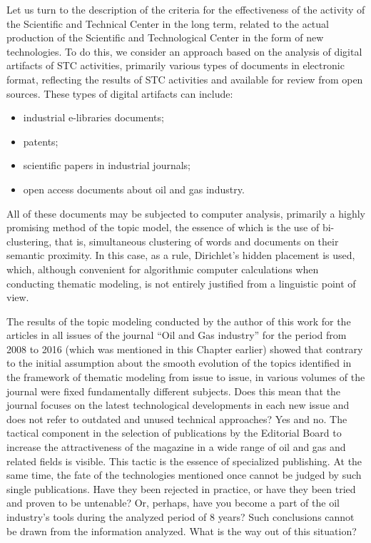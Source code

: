 \documentclass[12pt]{report}
\theoremstyle{definition}
\providecommand{\tightlist}{%
	\setlength{\itemsep}{0pt}\setlength{\parskip}{0pt}}
\begin{document}
Let us turn to the description of the criteria for the effectiveness of the activity of the Scientific and Technical Center in the long term, related to the actual production of the Scientific and Technological Center in the form of new technologies.
To do this, we consider an approach based on the analysis of digital artifacts of STC activities, primarily various types of documents in electronic format, reflecting the results of STC activities and available for review from open sources.
These types of digital artifacts can include:

\begin{itemize} 
	\tightlist 
	\item industrial e-libraries documents; 
	\item patents; 
	\item scientific papers in industrial journals; 
	\item open access documents about oil and gas industry. 
\end{itemize}  

All of these documents may be subjected to computer analysis, primarily a highly promising method of the topic model, the essence of which is the use of bi-clustering, that is, simultaneous clustering of words and documents on their semantic proximity.
In this case, as a rule, Dirichlet's hidden placement is used, which, although convenient for algorithmic computer calculations when conducting thematic modeling, is not entirely justified from a linguistic point of view.

The results of the topic modeling conducted by the author of this work for the articles in all issues of the journal  ``Oil and Gas industry'' for the period from 2008 to 2016 (which was mentioned in this Chapter earlier) showed that contrary to the initial assumption about the smooth evolution of the topics identified in the framework of thematic modeling from issue to issue, in various volumes of the journal were fixed fundamentally different subjects.
Does this mean that the journal focuses on the latest technological developments in each new issue and does not refer to outdated and unused technical approaches? Yes and no.
The tactical component in the selection of publications by the Editorial Board to increase the attractiveness of the magazine in a wide range of oil and gas and related fields is visible.
This tactic is the essence of specialized publishing.
At the same time, the fate of the technologies mentioned once cannot be judged by such single publications.
Have they been rejected in practice, or have they been tried and proven to be untenable? 
Or, perhaps, have you become a part of the oil industry's tools during the analyzed period of 8 years? 
Such conclusions cannot be drawn from the information analyzed.
What is the way out of this situation?
\end{document}
